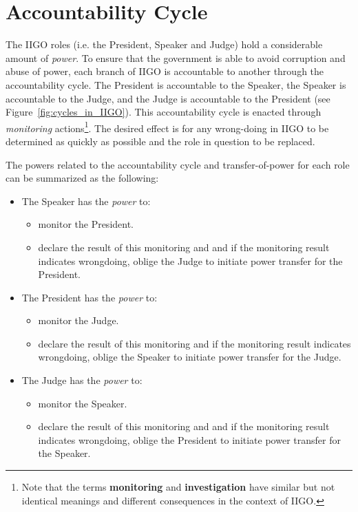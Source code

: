 \section{Accountability Cycle}
\label{sec:accountability}

The IIGO roles (i.e. the President, Speaker and Judge) hold a considerable amount of \emph{power}. To ensure that the government is able to avoid corruption and abuse of power, each branch of IIGO is accountable to another through the accountability cycle. 
The President is accountable to the Speaker, the Speaker is accountable to the Judge, and the Judge is accountable to the President (see Figure~\ref{fig:cycles_in_IIGO}). This accountability cycle is enacted through \emph{monitoring} actions\footnote{Note that the terms \textbf{monitoring} and \textbf{investigation} have similar but not identical meanings and different consequences in the context of IIGO.}. The desired effect is for any wrong-doing in IIGO to be determined as quickly as possible and the role in question to be replaced. 

The powers related to the accountability cycle and transfer-of-power for each role can be summarized as the following: 

\begin{itemize}
    \item The Speaker has the \emph{power} to:
    \begin{itemize}
        \item monitor the President.
        \item declare the result of this monitoring and and if the monitoring result indicates wrongdoing, oblige the Judge to initiate power transfer for the President.
    \end{itemize}
    \item The President has the \emph{power} to:
    \begin{itemize}
        \item monitor the Judge.
        \item declare the result of this monitoring and if the monitoring result indicates wrongdoing, oblige the Speaker to initiate power transfer for the Judge.
    \end{itemize}
    \item The Judge has the \emph{power} to:
    \begin{itemize}
        \item  monitor the Speaker.
        \item declare the result of this monitoring and and if the monitoring result indicates wrongdoing, oblige the President to initiate power transfer for the Speaker.
    \end{itemize}
\end{itemize}

